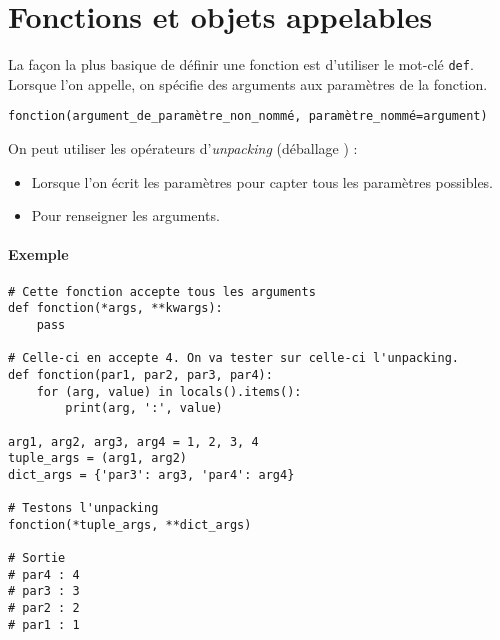 \section{Fonctions et objets appelables}
La façon la plus basique de définir une fonction est d'utiliser le mot-clé \texttt{def}. Lorsque l'on appelle, on spécifie des arguments aux paramètres de la fonction.

\begin{verbatim}
fonction(argument_de_paramètre_non_nommé, paramètre_nommé=argument)
\end{verbatim}

On peut utiliser les opérateurs d'\emph{unpacking} (\og déballage \fg{}) :
\begin{itemize}
    \item Lorsque l'on écrit les paramètres pour capter tous les paramètres possibles.
    \item Pour renseigner les arguments.
\end{itemize}

\paragraph{Exemple}
\begin{verbatim}
# Cette fonction accepte tous les arguments
def fonction(*args, **kwargs):
    pass

# Celle-ci en accepte 4. On va tester sur celle-ci l'unpacking.
def fonction(par1, par2, par3, par4):
    for (arg, value) in locals().items():
        print(arg, ':', value)

arg1, arg2, arg3, arg4 = 1, 2, 3, 4
tuple_args = (arg1, arg2)
dict_args = {'par3': arg3, 'par4': arg4}

# Testons l'unpacking
fonction(*tuple_args, **dict_args)

# Sortie
# par4 : 4
# par3 : 3
# par2 : 2
# par1 : 1
\end{verbatim}